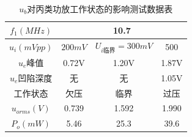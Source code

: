 \documentclass[UTF8]{ctexart}
\begin{document}
\begin{table}[H]
    \centering
    \caption{$u_b$对丙类功放工作状态的影响测试数据表}
    \label{table:5.1}
    \begin{tabular}{c|ccc}
    \hline
    $f_1(MHz)$    & \multicolumn{3}{c}{10.7}                           \\ \hline
    $u_i(mVpp)$ & \multicolumn{1}{c|}{$200mV$} & \multicolumn{1}{c|}{$U_{i\text{临界}}=300mV$} & 500 \\ \hline
    $u_e$峰值       & \multicolumn{1}{c|}{0.72V} & \multicolumn{1}{c|}{1.20V}   & 1.87V \\ \hline
    $u_e$凹陷深度     & \multicolumn{1}{c|}{无} & \multicolumn{1}{c|}{无}   &  1.05V\\ \hline
    工作状态          & \multicolumn{1}{c|}{欠压} & \multicolumn{1}{c|}{临界} &  过压\\ \hline
    $u_{orms}(V)$ & \multicolumn{1}{c|}{0.739} & \multicolumn{1}{c|}{1.592}   & 1.990 \\ \hline
    $P_o(mW)$     & \multicolumn{1}{c|}{5.46} & \multicolumn{1}{c|}{25.3}   &  39.6\\ \hline
    \end{tabular}
\end{table}
\end{document}
